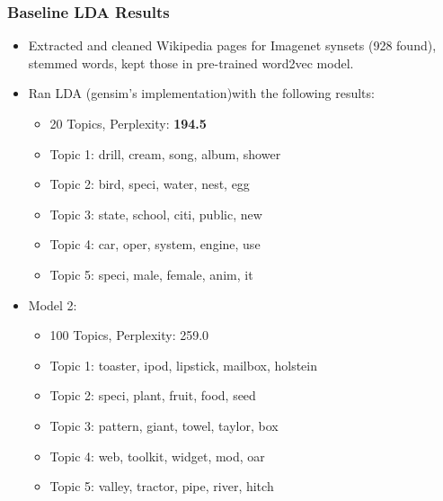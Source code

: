 \documentclass{beamer}
\begin{document}
\begin{frame}
  \frametitle{Baseline LDA Results}
  \begin{itemize}
    \item Extracted and cleaned Wikipedia pages for Imagenet synsets (928 found), stemmed words, kept those in pre-trained word2vec model.
    \item Ran LDA (gensim's implementation)with the following results:
    \begin{itemize}
      \item 20  Topics, Perplexity: \textbf{194.5}
      \item Topic 1: drill, cream, song, album, shower
      \item Topic 2: bird, speci, water, nest, egg
      \item Topic 3: state, school, citi, public, new
      \item Topic 4: car, oper, system, engine, use
      \item Topic 5: speci, male, female, anim, it 
    \end{itemize}
    \item Model 2:
    \begin{itemize}
      \item 100 Topics, Perplexity: 259.0
      \item Topic 1: toaster, ipod, lipstick, mailbox, holstein
      \item Topic 2: speci, plant, fruit, food, seed
      \item Topic 3: pattern, giant, towel, taylor, box
      \item Topic 4: web, toolkit, widget, mod, oar
      \item Topic 5: valley, tractor, pipe, river, hitch
    \end{itemize}
  \end{itemize}
\end{frame}
\end{document}
